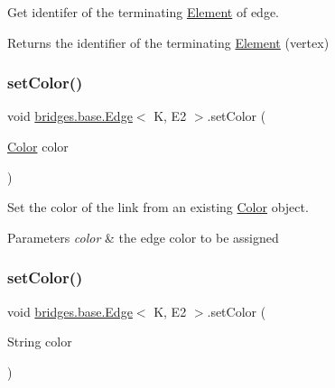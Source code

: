Get identifer of the terminating \mbox{\hyperlink{classbridges_1_1base_1_1_element}{Element}} of edge. 

\begin{DoxyReturn}{Returns}
the identifier of the terminating \mbox{\hyperlink{classbridges_1_1base_1_1_element}{Element}} (vertex) 
\end{DoxyReturn}
\mbox{\label{classbridges_1_1base_1_1_edge_a77f6d36e94a3cbb8e478c85a1a6dad84}} 
\subsubsection{\texorpdfstring{setColor()}{setColor()}\hspace{0.1cm}{\footnotesize\ttfamily [1/3]}}
{\footnotesize\ttfamily void \mbox{\hyperlink{classbridges_1_1base_1_1_edge}{bridges.\+base.\+Edge}}$<$ K, E2 $>$.set\+Color (\begin{DoxyParamCaption}\item[{\mbox{\hyperlink{classbridges_1_1base_1_1_color}{Color}}}]{color }\end{DoxyParamCaption})}



Set the color of the link from an existing \mbox{\hyperlink{classbridges_1_1base_1_1_color}{Color}} object. 


\begin{DoxyParams}{Parameters}
{\em color} & the edge color to be assigned \\
\hline
\end{DoxyParams}
\mbox{\label{classbridges_1_1base_1_1_edge_adc2dbd9f8d74f8749ba64515ca052909}} 
\subsubsection{\texorpdfstring{setColor()}{setColor()}\hspace{0.1cm}{\footnotesize\ttfamily [2/3]}}
{\footnotesize\ttfamily void \mbox{\hyperlink{classbridges_1_1base_1_1_edge}{bridges.\+base.\+Edge}}$<$ K, E2 $>$.set\+Color (\begin{DoxyParamCaption}\item[{String}]{color }\end{DoxyParamCaption})}



